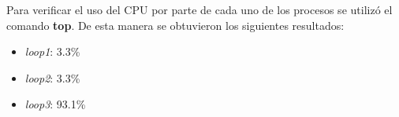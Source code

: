 \documentclass[a4paper,11pt] {article}
\begin{document}
\begin{enumerate}
    Para verificar el uso del CPU por parte de cada uno de los procesos se utiliz\'o el comando \textbf{top}. De esta manera se obtuvieron los siguientes resultados:
    \begin{itemize}
      \item \textit{loop1}: 3.3\%
      \item \textit{loop2}: 3.3\%
      \item \textit{loop3}: 93.1\%
    \end{itemize}

\end{enumerate}
\end{document}
